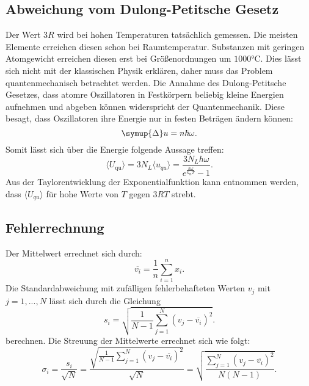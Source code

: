 \subsection{Abweichung vom Dulong-Petitsche Gesetz}
Der Wert $3R$ wird bei hohen Temperaturen tatsächlich gemessen.
Die meisten Elemente erreichen diesen schon bei Raumtemperatur.
Substanzen mit geringen Atomgewicht erreichen diesen erst bei
Größenordnungen um $1000\si{\celsius}$.
Dies lässt sich nicht mit der klassischen Physik erklären,
daher muss das Problem quantenmechanisch betrachtet werden.
Die Annahme des Dulong-Petitsche Gesetzes, dass atomre Oszillatoren in Festkörpern
beliebig kleine Energien aufnehmen und abgeben können widerspricht der Quantenmechanik.
Diese besagt, dass Oszillatoren ihre Energie nur in festen Beträgen ändern können:
\begin{equation}
\symup{\Delta} u = n \hbar \omega .
\end{equation}
Somit lässt sich über die Energie folgende Aussage treffen:
\begin{equation}
\langle U_\text{qu} \rangle = 3 N_L \langle u_{qu} \rangle = \frac{3 N_L h
\omega}{e^{\frac{h\omega}{k_\text{B}T}}-1} .
\end{equation}
Aus der Taylorentwicklung der Exponentialfunktion kann entnommen werden,
dass $\langle U_{qu} \rangle$ für hohe Werte von $T$ gegen $3RT$ strebt.
\subsection{Fehlerrechnung}
Der Mittelwert errechnet sich durch:
\begin{equation}
\label{eq:mittel}
\overline{v_i}=\frac{1}{n}\sum \limits_{i=1}^n x_i.
\end{equation}
Die Standardabweichung mit zufälligen fehlerbehafteten Werten $v_j$ mit $j=1,...,N$ lässt sich durch die Gleichung
\begin{equation}
\label{eq:standard}
s_i=\sqrt{\frac{1}{N-1}\sum \limits_{j=1}^N (v_j-\overline{v_i})^2}.
\end{equation}
berechnen.
Die Streuung der Mittelwerte errechnet sich wie folgt:
\begin{equation}
\label{eq:streuung}
\sigma_i=\frac{s_i}{\sqrt{N}}=\frac{{\sqrt{\frac{1}{N-1}\sum \limits_{j=1}^N (v_j-\overline{v_i})^2}}}{\sqrt{N}}=\sqrt{\frac{\sum \limits_{j=1}^N (v_j-\overline{v_i})^2}{N(N-1)}}.
\end{equation}
